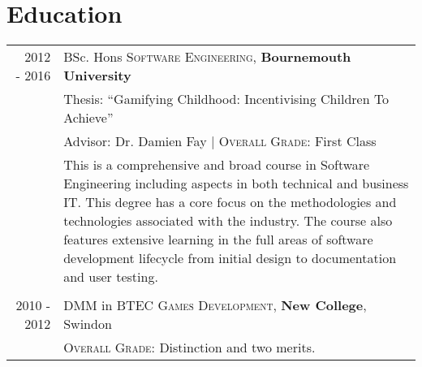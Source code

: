 \section{Education}
\begin{tabular}{r|p{11cm}}
	\ 2012 - 2016 & BSc. Hons \textsc{Software Engineering}, \textbf{Bournemouth University}\\ 
	\ & Thesis: ``Gamifying Childhood: Incentivising Children To Achieve'' \\
	\ & Advisor: Dr. Damien Fay | \normalsize \textsc{Overall Grade}: First Class \\
	\ & \footnotesize{This is a comprehensive and broad course in Software Engineering including aspects in both technical and business IT. This degree has a core focus on the methodologies and technologies associated with the industry. The course also features extensive learning in the full areas of software development lifecycle from initial design to documentation and user testing.} \\

	\multicolumn{2}{c}{} \\


	2010 - 2012 & DMM in BTEC \textsc{Games Development}, \textbf{New College}, Swindon\\
	\ & \textsc{Overall Grade}: Distinction and two merits.
\end{tabular}
